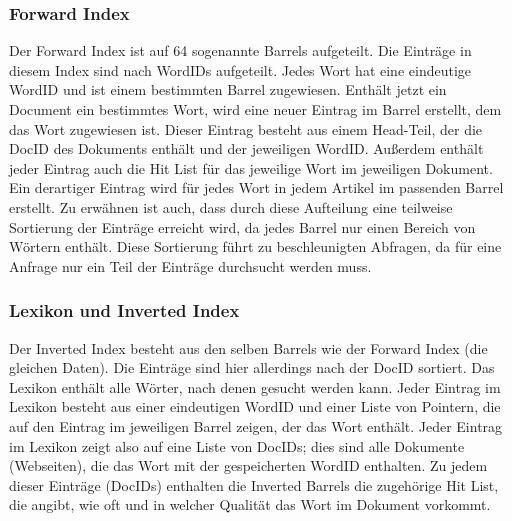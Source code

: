 \documentclass[12pt, a4paper]{llncs}
\begin{document}
	\subsubsection{Forward Index}
	Der Forward Index ist auf 64 sogenannte Barrels aufgeteilt. Die Einträge in diesem Index sind nach WordIDs aufgeteilt. Jedes Wort hat eine eindeutige WordID und ist 
	einem bestimmten Barrel zugewiesen. Enthält jetzt ein Document ein bestimmtes Wort, wird eine neuer Eintrag im Barrel erstellt, dem das Wort zugewiesen ist. Dieser
	Eintrag besteht aus einem Head-Teil, der die DocID des Dokuments enthält und der jeweiligen WordID. Außerdem enthält jeder Eintrag auch die Hit List für das jeweilige
	Wort im jeweiligen Dokument. Ein derartiger Eintrag wird für jedes Wort in jedem Artikel im passenden Barrel erstellt. Zu erwähnen ist auch, dass durch diese Aufteilung
	eine teilweise Sortierung der Einträge erreicht wird, da jedes Barrel nur einen Bereich von Wörtern enthält. Diese Sortierung führt zu beschleunigten Abfragen, da für eine
	Anfrage nur ein Teil der Einträge durchsucht werden muss.\cite{page98}
	
	\subsubsection{Lexikon und Inverted Index}
	Der Inverted Index besteht aus den selben Barrels wie der Forward Index (die gleichen Daten). Die Einträge sind hier allerdings nach der DocID sortiert.
	Das Lexikon enthält alle Wörter, nach denen gesucht werden kann. Jeder Eintrag im Lexikon besteht aus einer eindeutigen WordID und einer Liste von Pointern, die auf den
	Eintrag im jeweiligen Barrel zeigen, der das Wort enthält. Jeder Eintrag im Lexikon zeigt also auf eine Liste von DocIDs; dies sind alle Dokumente (Webseiten), die das
	Wort mit der gespeicherten WordID enthalten. Zu jedem dieser Einträge (DocIDs) enthalten die Inverted Barrels die zugehörige Hit List, die angibt, wie oft und in welcher
	Qualität das Wort im Dokument vorkommt.\cite{page98}
	
	
\end{document}
